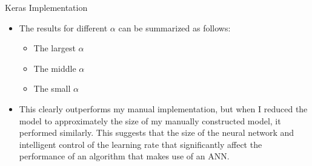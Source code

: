 \documentclass[a4paper]{article}
\begin{document}
Keras Implementation
\begin{itemize}
    \item The results for different $\alpha$ can be summarized as follows:
    \begin{itemize}
        \item The largest $\alpha$
        \item The middle $\alpha$ 
        \item The small $\alpha$ 
    \end{itemize}
    \item This clearly outperforms my manual implementation, but when I
        reduced the model to approximately the size of my manually constructed
        model, it performed similarly. This suggests that the size of the
        neural network and intelligent control of the learning rate that
        significantly affect the performance of an algorithm that makes use of
        an ANN.
\end{itemize}
\end{document}
